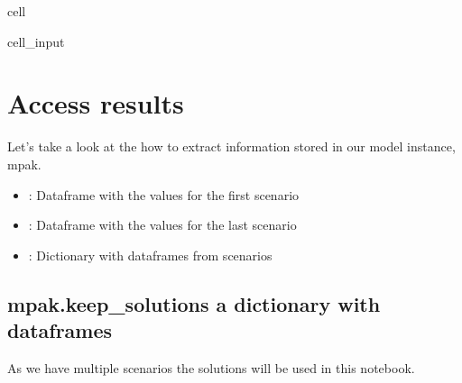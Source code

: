 \documentclass[letterpaper,10pt,english]{jupyterBook}
\begin{document}
\begin{sphinxuseclass}{cell}\begin{sphinxVerbatimInput}

\begin{sphinxuseclass}{cell_input}
\begin{sphinxVerbatim}[commandchars=\\\{\}]
    
          
\end{sphinxVerbatim}

\end{sphinxuseclass}\end{sphinxVerbatimInput}

\end{sphinxuseclass}

\section{Access results}
\label{\detokenize{content/howto/experiments/create_save_scenarios:access-results}}
\sphinxAtStartPar
Let’s take a look at the how to extract information stored in our model instance, mpak.
\begin{itemize}
\item {} 
\sphinxAtStartPar
{}: Dataframe with the values for the first scenario

\item {} 
\sphinxAtStartPar
{}: Dataframe with the values for the last scenario

\item {} 
\sphinxAtStartPar
{}: Dictionary with dataframes from  scenarios

\end{itemize}


\subsection{mpak.keep\_solutions a dictionary with dataframes}
\label{\detokenize{content/howto/experiments/create_save_scenarios:mpak-keep-solutions-a-dictionary-with-dataframes}}
\sphinxAtStartPar
As we have multiple scenarios the  solutions will be used in this notebook. 
\end{document}

